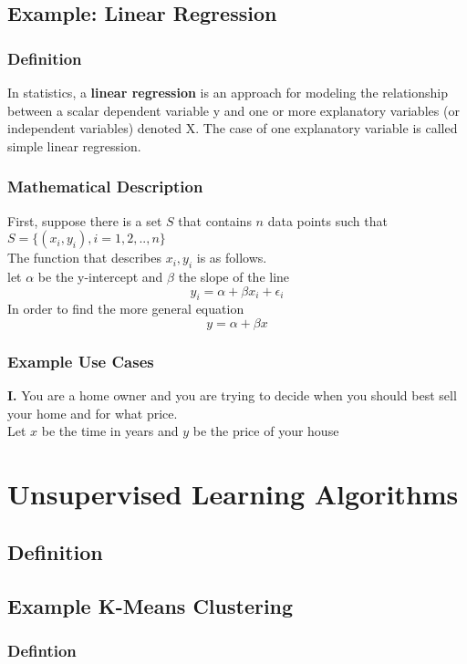 \documentclass{article}
\begin{document}
\subsection{Example: Linear Regression}
\subsubsection{Definition}
In statistics, a \textbf{linear regression} is an approach for modeling the relationship between a scalar dependent variable y and one or more explanatory variables (or independent variables) denoted X. The case of one explanatory variable is called simple linear regression.
\subsubsection{Mathematical Description}
First, suppose there is a set $S$ that contains $n$ data points such that \\ $S = \{(x_i,y_i),i=1,2,..,n\}$ \\
The function that describes $x_i,y_i$ is as follows.\\
let $\alpha$ be the y-intercept and $\beta$ the slope of the line
\begin{equation}
	y_i = \alpha + \beta x_i + \epsilon _i
\end{equation}
In order to find the more general equation
\begin{equation}
	y = \alpha + \beta x
\end{equation}
\subsubsection{Example Use Cases}
\textbf{I.} You are a home owner and you are trying to decide when you should best sell your home and for what price.\\
Let $x$ be the time in years and $y$ be the price of your house
\section{Unsupervised Learning Algorithms}
\subsection{Definition}
\subsection{Example K-Means Clustering}
\subsubsection{Defintion}
\end{document}
